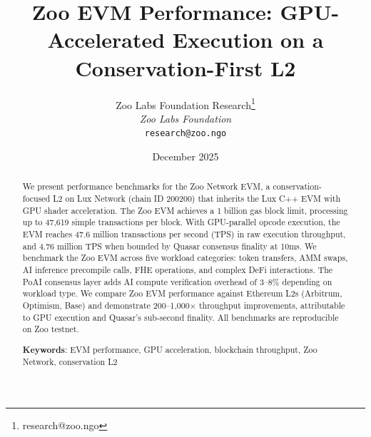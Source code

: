 \documentclass[11pt,letterpaper]{article}
\title{\textbf{Zoo EVM Performance: GPU-Accelerated Execution on a Conservation-First L2}}
\author{
Zoo Labs Foundation Research\thanks{research@zoo.ngo}\\
\textit{Zoo Labs Foundation}\\
\texttt{research@zoo.ngo}
}
\date{December 2025}
\begin{document}
\zoocoverpage

\begin{abstract}
We present performance benchmarks for the Zoo Network EVM, a conservation-focused L2 on Lux Network (chain ID 200200) that inherits the Lux C++ EVM with GPU shader acceleration. The Zoo EVM achieves a 1 billion gas block limit, processing up to 47,619 simple transactions per block. With GPU-parallel opcode execution, the EVM reaches 47.6 million transactions per second (TPS) in raw execution throughput, and 4.76 million TPS when bounded by Quasar consensus finality at 10ms. We benchmark the Zoo EVM across five workload categories: token transfers, AMM swaps, AI inference precompile calls, FHE operations, and complex DeFi interactions. The PoAI consensus layer adds AI compute verification overhead of 3--8\% depending on workload type. We compare Zoo EVM performance against Ethereum L2s (Arbitrum, Optimism, Base) and demonstrate 200--1,000$\times$ throughput improvements, attributable to GPU execution and Quasar's sub-second finality. All benchmarks are reproducible on Zoo testnet.

\textbf{Keywords}: EVM performance, GPU acceleration, blockchain throughput, Zoo Network, conservation L2
\end{abstract}











\end{document}
